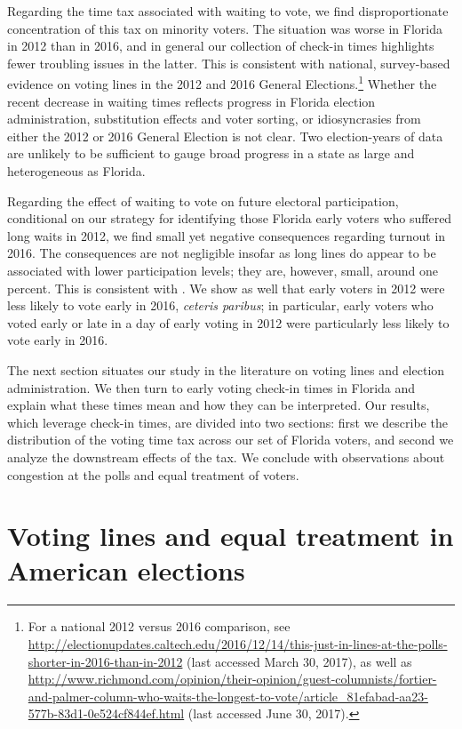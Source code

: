 \documentclass[12pt,titlepage]{article}
\begin{document}
Regarding the time tax associated with waiting to vote, we find
disproportionate concentration of this tax on minority voters.  The
situation was worse in Florida in 2012 than in 2016, and in general
our collection of check-in times highlights fewer troubling issues in
the latter.  This is consistent with national, survey-based evidence
on voting lines in the 2012 and 2016 General Elections.\footnote{For a
  national 2012 versus 2016 comparison, see
  \url{http://electionupdates.caltech.edu/2016/12/14/this-just-in-lines-at-the-polls-shorter-in-2016-than-in-2012}
  (last accessed March 30, 2017), as well as
  \url{http://www.richmond.com/opinion/their-opinion/guest-columnists/fortier-and-palmer-column-who-waits-the-longest-to-vote/article_81efabad-aa23-577b-83d1-0e524cf844ef.html}
  (last accessed June 30, 2017).}  Whether the recent decrease in
waiting times reflects progress in Florida election administration,
substitution effects and voter sorting, or idiosyncrasies from either
the 2012 or 2016 General Election is not clear.  Two election-years of
data are unlikely to be sufficient to gauge broad progress in a state
as large and heterogeneous as Florida.

Regarding the effect of waiting to vote on future electoral
participation, conditional on our strategy for identifying those
Florida early voters who suffered long waits in 2012, we find small
yet negative consequences regarding turnout in 2016. The consequences
are not negligible insofar as long lines do appear to be associated
with lower participation levels; they are, however, small, around one
percent. This is consistent with
\citet{pettigrew:longlinesminorityprecincts}.  We show as well that
early voters in 2012 were less likely to vote early in 2016,
\emph{ceteris paribus}; in particular, early voters who voted early or
late in a day of early voting in 2012 were particularly less likely to
vote early in 2016.

The next section situates our study in the literature on voting lines
and election administration.  We then turn to early voting check-in
times in Florida and explain what these times mean and how they can be
interpreted.  Our results, which leverage check-in times, are divided
into two sections: first we describe the distribution of the voting
time tax across our set of Florida voters, and second we analyze the
downstream effects of the tax.  We conclude with observations about
congestion at the polls and equal treatment of voters.

\section*{Voting lines and equal treatment in American elections}
\end{document}
